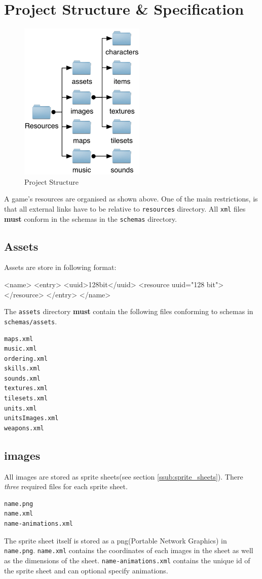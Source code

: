 \section{Project Structure \& Specification}
\label{sec:project_structure___specification}


\begin{figure}[htbp]
	\centering
		\includegraphics[height=3in]{figures/Files.pdf}
	\caption{Project Structure}
	\label{fig:figures_Files}
\end{figure}

A game's resources  are organised as shown above. One of the main restrictions, is that all external links have to be relative to \texttt{resources} directory. All \texttt{xml} files \textbf{must} conform in the schemas in the \texttt{schemas} directory. 


\subsection{Assets}
Assets are store in following format:
\begin{lst:resource}[caption=Assets format]
<name>
  <entry>
    <uuid>128bit</uuid> 
    <resource uuid="128 bit">
    </resource>
  </entry>
</name>
\end{lst:resource}

The \texttt{assets} directory \textbf{must} contain the following files conforming to schemas in \texttt{schemas/assets}.
\begin{lstlisting}[caption=Required Assets]
maps.xml
music.xml
ordering.xml
skills.xml
sounds.xml
textures.xml
tilesets.xml
units.xml
unitsImages.xml
weapons.xml
\end{lstlisting}

\subsection{images}
All images are stored as sprite sheets(see section \ref{ssub:sprite_sheets}).  There \emph{three} required files for each sprite sheet. 
\begin{lstlisting}
name.png
name.xml
name-animations.xml
\end{lstlisting}
The sprite sheet itself is stored as  a png(Portable Network Graphics) in \texttt{name.png}. \texttt{name.xml} contains the coordinates of each images in the sheet as well as the dimensions of the sheet. \texttt{name-animations.xml} contains the unique id of the sprite sheet and can optional specify animations. 


